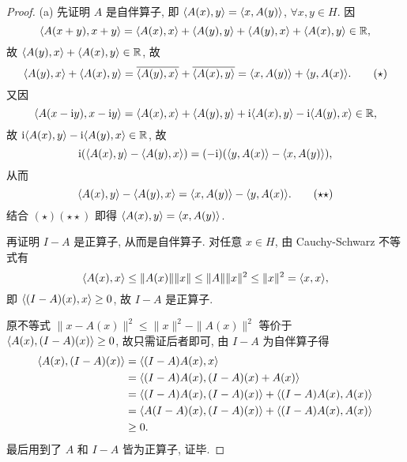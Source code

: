 \begin{proof}
    (a) 先证明 $A$ 是自伴算子, 即 $\langle A(x),y\rangle=\langle x,A(y)\rangle$, $\forall x,y\in H$. 因
    \[\langle A(x+y),x+y\rangle=\langle A(x),x\rangle+\langle A(y),y\rangle+\langle A(y),x\rangle+\langle A(x),y\rangle\in\mathbb{R},\]
    故 $\langle A(y),x\rangle+\langle A(x),y\rangle\in\mathbb{R}$, 故
    \begin{equation}
            \langle A(y),x\rangle+\langle A(x),y\rangle=\overline{\langle A(y),x\rangle}+\overline{\langle A(x),y\rangle}=\langle x,A(y)\rangle+\langle y,A(x)\rangle.\tag{$\star$}
    \end{equation}
    又因
    \[\langle A(x-\mathrm{i} y),x-\mathrm{i} y\rangle=\langle A(x),x\rangle+\langle A(y),y\rangle+\mathrm{i}\langle A(x),y\rangle-\mathrm{i}\langle A(y),x\rangle\in\mathbb{R},\]
    故 $\mathrm{i}\langle A(x),y\rangle-\mathrm{i}\langle A(y),x\rangle\in\mathbb{R}$, 故
    \[\mathrm{i}(\langle A(x),y\rangle-\langle A(y),x\rangle)=(-\mathrm{i})(\langle y,A(x)\rangle-\langle x,A(y)\rangle),\]
    从而
    \begin{equation}
        \langle A(x),y\rangle-\langle A(y),x\rangle=\langle x,A(y)\rangle-\langle y,A(x)\rangle.\tag{$\star\star$}
    \end{equation}
    结合 $(\star)(\star\star)$ 即得 $\langle A(x),y\rangle=\langle x,A(y)\rangle$.

    再证明 $I-A$ 是正算子, 从而是自伴算子. 对任意 $x\in H$, 由 Cauchy-Schwarz 不等式有
    \[\langle A(x),x\rangle\leq\|A(x)\|\|x\|\leq\|A\|\|x\|^2\leq\|x\|^2=\langle x,x\rangle,\]
    即 $\langle(I-A)(x),x\rangle\geq 0$, 故 $I-A$ 是正算子.

    原不等式 $\|x-A(x)\|^2\leq\|x\|^2-\|A(x)\|^2$ 等价于 $\langle A(x),(I-A)(x)\rangle\geq 0$,
    故只需证后者即可, 由 $I-A$ 为自伴算子得
    \begin{align*}
        \langle A(x),(I-A)(x)\rangle
        & =\langle(I-A)A(x),x\rangle \\
        & =\langle(I-A)A(x),(I-A)(x)+A(x)\rangle \\
        & =\langle(I-A)A(x),(I-A)(x)\rangle+\langle(I-A)A(x),A(x)\rangle \\
        & =\langle A(I-A)(x),(I-A)(x)\rangle+\langle(I-A)A(x),A(x)\rangle \\
        & \geq 0.
    \end{align*}
    最后用到了 $A$ 和 $I-A$ 皆为正算子, 证毕.


\end{proof}
